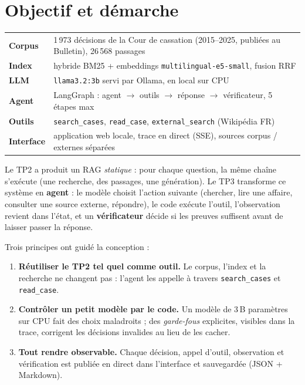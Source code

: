 \documentclass[11pt,a4paper]{article}
\begin{document}
\section{Objectif et démarche}

\begin{keybox}
\begin{tabularx}{\linewidth}{@{}l X@{}}
\textbf{Corpus} & 1\,973 décisions de la Cour de cassation (2015--2025, publiées au Bulletin), 26\,568 passages \\
\textbf{Index} & hybride BM25 + embeddings \texttt{multilingual-e5-small}, fusion RRF \\
\textbf{LLM} & \texttt{llama3.2:3b} servi par Ollama, en local sur CPU \\
\textbf{Agent} & LangGraph : agent $\rightarrow$ outils $\rightarrow$ réponse $\rightarrow$ vérificateur, 5 étapes max \\
\textbf{Outils} & \texttt{search\_cases}, \texttt{read\_case}, \texttt{external\_search} (Wikipédia FR) \\
\textbf{Interface} & application web locale, trace en direct (SSE), sources corpus / externes séparées \\
\end{tabularx}
\end{keybox}


Le TP2 a produit un RAG \emph{statique} : pour chaque question, la même chaîne s'exécute
(une recherche, des passages, une génération). Le TP3 transforme ce système en \textbf{agent} :
le modèle choisit l'action suivante (chercher, lire une affaire, consulter une source externe,
répondre), le code exécute l'outil, l'observation revient dans l'état, et un
\textbf{vérificateur} décide si les preuves suffisent avant de laisser passer la réponse.

Trois principes ont guidé la conception :
\begin{enumerate}
  \item \textbf{Réutiliser le TP2 tel quel comme outil.} Le corpus, l'index et la recherche ne
        changent pas : l'agent les appelle à travers \texttt{search\_cases} et \texttt{read\_case}.
  \item \textbf{Contrôler un petit modèle par le code.} Un modèle de 3\,B paramètres sur CPU fait des
        choix maladroits ; des \emph{garde-fous} explicites, visibles dans la trace, corrigent les
        décisions invalides au lieu de les cacher.
  \item \textbf{Tout rendre observable.} Chaque décision, appel d'outil, observation et vérification
        est publiée en direct dans l'interface et sauvegardée (JSON + Markdown).
\end{enumerate}
\end{document}
